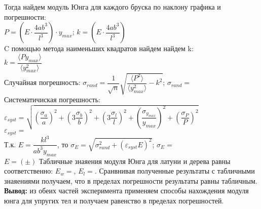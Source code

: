 \documentclass[a4paper,12pt]{article}
\begin{document}
Тогда найдем модуль Юнга для каждого бруска по наклону графика и погрешности:\\
\(P = \left(E\cdot \dfrac{4ab^3}{l^3}\right)\cdot y_{max}\);
\(k = \left(E\cdot \dfrac{4ab^3}{l^3}\right)\)\\ 
C помощью метода наименьших квадратов найдем найдем k:\\
\(k = \dfrac{\langle P y_{max}\rangle}{\langle y_{max}^2\rangle}\)\\ Случайная погрешность: 
\(\sigma_{rand} = \dfrac{1}{\sqrt{n}}\sqrt{\dfrac{\langle P^2 \rangle}{\langle y_{max}^2 \rangle} - k^2}\); \(\sigma_{rand} =\) \\
Систематичиская погрешность: \\
\(\varepsilon_{syst} = \sqrt{\left( \dfrac{\sigma_{a}}{a} \right)^2 + \left(3 \dfrac{\sigma_{b}}{b} \right)^2 + \left( 3\dfrac{\sigma_{l}}{l} \right)^2 + \left( \dfrac{\sigma_{y_{max}}}{y_{max}} \right)^2 + \left( \dfrac{\sigma_{P}}{P} \right)^2}\)\\
\( \varepsilon_{syst} = \)\\
Т.к. \( E = \dfrac{kl^3}{ab^3y_{max}} \), то 
\( \sigma_E = \sqrt{ \sigma_{rand}^2 + ( \varepsilon_{syst}E )^2} \);
\(\sigma_E = \)\\
\(E = ( \pm )\)
Табличные знаяения модуля Юнга для латуни и дерева равны соответственно: \(E_w = \), \(E_l = \). Сранвнивая полученные результаты с табличными знаяениями получаем, что в пределах погрешности результаты равны табличным. \\
\textbf{Вывод:} из обеих частей эксперимента применяем способы нахождения модуля юнга для упругих тел и получаем равенство в пределах погрешностей.
\end{document}
